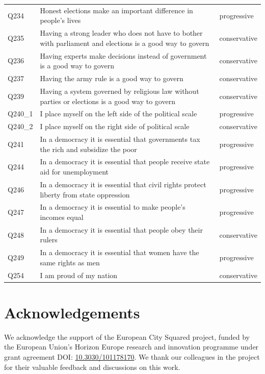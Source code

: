 \documentclass[]{ceurart}
\begin{document}
\begin{longtable}{@{\extracolsep{\fill}}l>{\raggedright\arraybackslash}p{}l}
Q234 & Honest elections make an important difference in people’s lives & progressive \\ 
Q235 & Having a strong leader who does not have to bother with parliament and elections is a good way to govern & conservative \\ 
Q236 & Having experts make decisions instead of government is a good way to govern & conservative \\ 
Q237 & Having the army rule is a good way to govern & conservative \\ 
Q239 & Having a system governed by religious law without parties or elections is a good way to govern & conservative \\ 
Q240\_1 & I place myself on the left side of the political scale & progressive \\ 
Q240\_2 & I place myself on the right side of political scale & conservative \\ 
Q241 & In a democracy it is essential that governments tax the rich and subsidize the poor & progressive \\ 
Q244 & In a democracy it is essential that people receive state aid for unemployment & progressive \\ 
Q246 & In a democracy it is essential that civil rights protect liberty from state oppression & progressive \\ 
Q247 & In a democracy it is essential to make people’s incomes equal & progressive \\ 
Q248 & In a democracy it is essential that people obey their rulers & conservative \\ 
Q249 & In a democracy it is essential that women have the same rights as men & progressive \\ 
Q254 & I am proud of my nation & conservative \\ 
\bottomrule

\end{longtable}

\endgroup

\section*{Acknowledgements}\label{acknowledgements}

We acknowledge the support of the European City Squared project, funded
by the European Union's Horizon Europe research and innovation programme
under grant agreement DOI:
\href{https://doi.org/10.3030/101178170}{10.3030/101178170}. We thank
our colleagues in the project for their valuable feedback and
discussions on this work.
\end{document}
